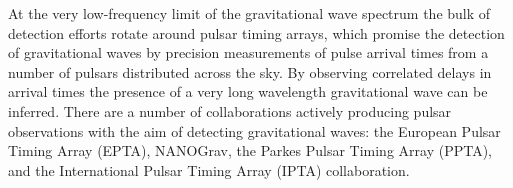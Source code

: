   At the very low-frequency limit of the gravitational wave spectrum
  the bulk of detection efforts rotate around pulsar timing arrays,
  which promise the detection of gravitational waves by precision
  measurements of pulse arrival times from a number of pulsars
  distributed across the sky. By observing correlated
  delays\cite{1983ApJ...265L..39H} in arrival times the presence of a
  very long wavelength gravitational wave can be inferred. There are a
  number of collaborations actively producing pulsar observations with
  the aim of detecting gravitational waves: the European Pulsar Timing
  Array (EPTA)\cite{2013CQGra..30v4009K},
  NANOGrav\cite{2009arXiv0909.1058J}, the Parkes Pulsar Timing Array
  (PPTA)\cite{2013PASA...30...17M}, and the International Pulsar
  Timing Array (IPTA) collaboration\cite{2013CQGra..30v4010M}. %

